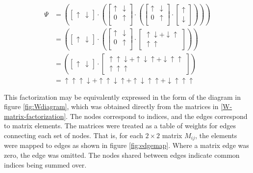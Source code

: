 \documentclass[12pt]{amsbook}
\theoremstyle{plain}
\theoremstyle{definition}
\theoremstyle{remark}
\newcommand{\bmat}[4]{
\begin{bmatrix}
#1 & #2\\
#3 & #4\\
\end{bmatrix}
}
\newcommand{\paren}[1]{\left(#1\right)}
\begin{document}
$$
\begin{aligned}
  \Psi &= \paren{\begin{bmatrix}\uparrow & \downarrow \end{bmatrix}\cdot
          \paren{\bmat{\uparrow}{\downarrow}{0}{\uparrow}\cdot
          \paren{\bmat{\uparrow}{\downarrow}{0}{\uparrow}\cdot
          \begin{bmatrix}\uparrow \\ \downarrow \end{bmatrix}}}}\\
       &= \paren{\begin{bmatrix}\uparrow & \downarrow \end{bmatrix}\cdot
          \paren{\bmat{\uparrow}{\downarrow}{0}{\uparrow}\cdot
          \begin{bmatrix}\uparrow\downarrow+\downarrow\uparrow \\ \uparrow\uparrow \end{bmatrix}}}\\
       &= \paren{\begin{bmatrix}\uparrow & \downarrow \end{bmatrix}\cdot
          \begin{bmatrix}\uparrow\uparrow\downarrow+\uparrow\downarrow\uparrow+ \downarrow\uparrow\uparrow \\ \uparrow\uparrow\uparrow \end{bmatrix}}\\
       &= \uparrow\uparrow\uparrow\downarrow + \uparrow\uparrow\downarrow\uparrow + \uparrow\downarrow\uparrow\uparrow + \downarrow\uparrow\uparrow\uparrow
\end{aligned}
$$

This factorization may be equivalently expressed in the form of the diagram in figure \ref{fig:Wdiagram}, which was obtained directly from the matrices in \eqref{W-matrix-factorization}.  The nodes correspond to indices, and the edges correspond to matrix elements.  The matrices were treated as a table of weights for edges connecting each set of nodes.  That is, for each $2\times 2$ matrix $M_{ij}$, the elements were mapped to edges as shown in figure \ref{fig:edgemap}.  Where a matrix edge was zero, the edge was omitted.  The nodes shared between edges indicate common indices being summed over.
\end{document}
